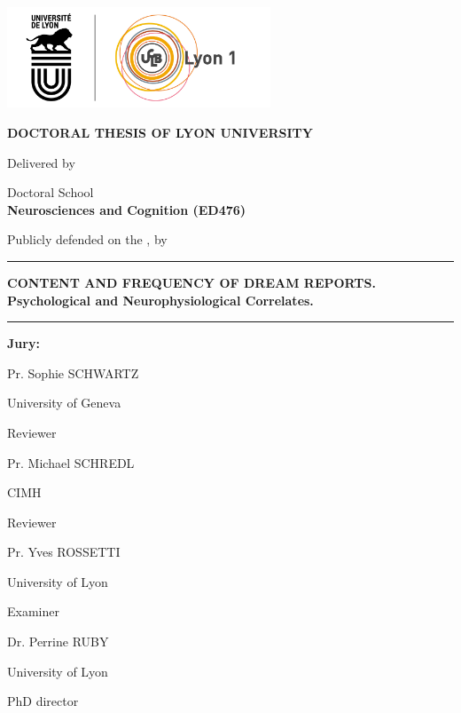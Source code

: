 \begin{titlepage}

  \setlength{\parindent}{0pt}
  \thispagestyle{empty}

  \begin{center}
  \includegraphics[height=3cm]{content/logo}
  \end{center}

  \bigskip

  \begin{center}
  \fontsize{14pt}{16pt}\selectfont
  \textbf{\uppercase{DOCTORAL THESIS OF LYON UNIVERSITY}} \\

  \vspace*{1cm}

  \fontsize{12pt}{14pt}\selectfont
  Delivered by\\ \medskip
  \textbf{\thesisUniversity}

  Doctoral School\\ \medskip
  \textbf{Neurosciences and Cognition (ED476)}


  \vspace*{0.5cm}

  Publicly defended on the \thesisDate, by \\ \medskip
  \fontsize{14pt}{16pt}\selectfont
  \textbf{\thesisName}

  \vspace*{0.5cm}

  \rule{\textwidth}{0.5pt}

  \fontsize{16pt}{20pt}\selectfont
  \textbf{CONTENT AND FREQUENCY OF DREAM REPORTS.\\ \medskip
  Psychological and Neurophysiological Correlates.}
  \rule{\textwidth}{0.5pt}

  \end{center}

  \vspace*{0.5cm}

  \fontsize{12pt}{14pt}\selectfont
  \textbf{Jury:}

  \newcommand\textline[4][t]{%
      \par\noindent\parbox[#1]{.333\textwidth}{\raggedright#2}%
      \parbox[#1]{.333\textwidth}{\centering#3}%
      \parbox[#1]{.333\textwidth}{\raggedleft#4}\par
  }

  \textline[t]{Pr. Sophie SCHWARTZ}{University of Geneva}{Reviewer}
  \textline[t]{Pr. Michael SCHREDL}{CIMH}{Reviewer}
  \textline[t]{Pr. Yves ROSSETTI}{University of Lyon}{Examiner}
  \textline[t]{Dr. Perrine RUBY }{University of Lyon}{PhD director}

  \vfill

\end{titlepage}
